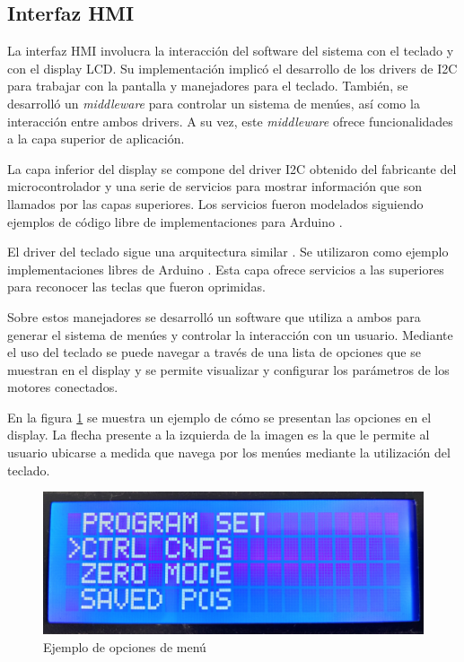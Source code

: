 \subsection{Interfaz HMI}

La interfaz HMI involucra la interacción del software del sistema con el teclado y con el display LCD. Su implementación implicó el desarrollo de los drivers de I2C para trabajar con la pantalla y manejadores para el teclado. También, se desarrolló un \textit{middleware} para controlar un sistema de menúes, así como la interacción entre ambos drivers. A su vez, este \textit{middleware} ofrece funcionalidades a la capa superior de aplicación.

La capa inferior del display se compone del driver I2C obtenido del fabricante del microcontrolador y una serie de servicios para mostrar información que son llamados por las capas superiores. Los servicios fueron modelados siguiendo ejemplos de código libre de implementaciones para Arduino \citep{web_repo_display_i2c}.

El driver del teclado sigue una arquitectura similar \citep{web_repo_keypad}. Se utilizaron como ejemplo implementaciones libres de Arduino \citep{web_repo_keypad}. Esta capa ofrece servicios a las superiores para reconocer las teclas que fueron oprimidas.

Sobre estos manejadores se desarrolló un software que utiliza a ambos para generar el sistema de menúes y controlar la interacción con un usuario. Mediante el uso del teclado se puede navegar a través de una lista de opciones que se muestran en el display y se permite visualizar y configurar los parámetros de los motores conectados. 

En la figura \ref{fig:menu} se muestra un ejemplo de cómo se presentan las opciones en el display. La flecha presente a la izquierda de la imagen es la que le permite al usuario ubicarse a medida que navega por los menúes mediante la utilización del teclado.

\begin{figure}[htbp]
	\centering
	\includegraphics[scale=.08]{./Figures/display_menu.jpg}
	\caption{Ejemplo de opciones de menú}
	\label{fig:menu}
\end{figure}

